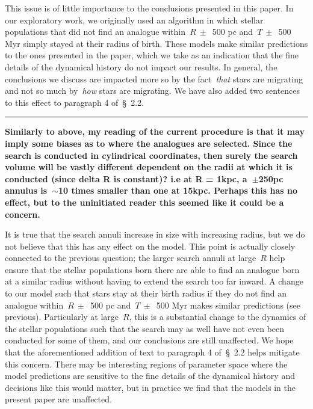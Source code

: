 \documentclass{report}
\newcommand{\breakline}{\noindent\rule{\textwidth}{1pt}}
\begin{document}
\par 
This issue is of little importance to the conclusions presented in this paper. 
In our exploratory work, we originally used an algorithm in which stellar 
populations that did not find an analogue within~$R~\pm$~500 pc and~$T~\pm$~500 
Myr simply stayed at their radius of birth. 
These models make similar predictions to the ones presented in the paper, which 
we take as an indication that the fine details of the dynamical history do 
not impact our results. 
In general, the conclusions we discuss are impacted more so by the 
fact~\textit{that} stars are migrating and not so much by~\textit{how} stars 
are migrating. We have also added two sentences to this effect to paragraph 4 
of~\S~2.2. 

\par\null\par 
\breakline 
\par\null\par 
\textbf{
	Similarly to above, my reading of the current procedure is that it may 
	imply some biases as to where the analogues are selected. 
	Since the search is conducted in cylindrical coordinates, then surely the 
	search volume will be vastly different dependent on the radii at which it 
	is conducted (since delta R is constant)? 
	i.e at R = 1kpc, a~$\pm$250pc annulus is~$\sim$10 times smaller than one at 
	15kpc. 
	Perhaps this has no effect, but to the uninitiated reader this seemed like 
	it could be a concern.
} 
\par 
It is true that the search annuli increase in size with increasing radius, but 
we do not believe that this has any effect on the model. 
This point is actually closely connected to the previous question; the larger 
search annuli at large~$R$ help ensure that the stellar populations born there 
are able to find an analogue born at a similar radius without having to extend 
the search too far inward. 
A change to our model such that stars stay at their birth radius if they do not 
find an analogue within~$R~\pm$~500 pc and~$T~\pm$~500 Myr makes similar 
predictions (see previous). 
Particularly at large~$R$, this is a substantial change to the dynamics of the 
stellar populations such that the search may as well have not even been 
conducted for some of them, and our conclusions are still unaffected. 
We hope that the aforementioned addition of text to paragraph 4 of~\S~2.2 
helps mitigate this concern. 
There may be interesting regions of parameter space where the model predictions 
are sensitive to the fine details of the dynamical history and decisions like 
this would matter, but in practice we find that the models in the present paper 
are unaffected. 
\end{document}
